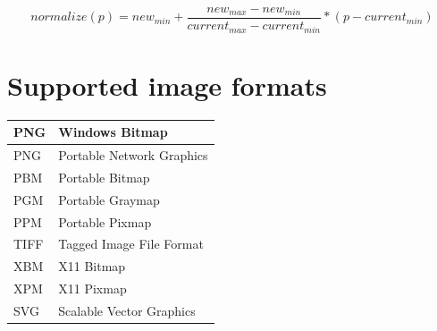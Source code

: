 \documentclass{article}
\begin{document}
		\begin{equation}
			normalize(p)=new_{min}+\frac{new_{max}-new_{min}}{current_{max}-current_{min}}*(p-current_{min})
			\label{eq:normalization}
		\end{equation}
		
		
\section{Supported image formats}


		\begin{center}
		    \begin{tabular}{ | l | l |}
		    \hline
		    	PNG & Windows Bitmap \\ \hline
			PNG & Portable Network Graphics\\ \hline
			PBM & Portable Bitmap\\ \hline
			PGM & Portable Graymap\\ \hline
			PPM & Portable Pixmap\\ \hline
			TIFF & Tagged Image File Format\\ \hline
			XBM & X11 Bitmap\\ \hline
			XPM & X11 Pixmap\\ \hline
			SVG & Scalable Vector Graphics\\ \hline
		    \end{tabular}
\end{center}
\end{document}
